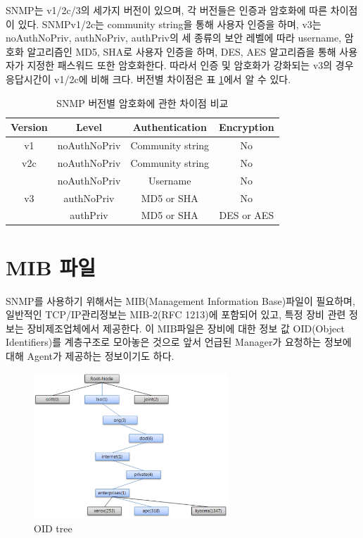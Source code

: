 \documentclass[11pt
  , a4paper
  , article
  , oneside
]{memoir}
\begin{document}
\hfil\break
\hfil\break
\hfil\break
\hfil\break

SNMP는 v1/2c/3의 세가지 버전이 있으며, 각 버전들은 인증과 암호화에 따른 차이점이 있다. SNMPv1/2c는 community string을 통해 사용자 인증을 하며, v3는 noAuthNoPriv, authNoPriv, authPriv의 세 종류의 보안 레벨에 따라 username, 암호화 알고리즘인 MD5, SHA로 사용자 인증을 하며, DES, AES 알고리즘을 통해 사용자가 지정한 패스워드 또한 암호화한다. 따라서 인증 및 암호화가 강화되는 v3의 경우 응답시간이 v1/2c에 비해 크다. 버전별 차이점은 표 \ref{table:conparision}\citep{comparison}에서 알 수 있다.

\begin{table}[h!]
\begin{center}
\begin{tabular}{c|c|c|c}\hline
Version & Level & Authentication & Encryption \\ \hline
v1 & noAuthNoPriv & Community string & No \\ \hline
v2c & noAuthNoPriv & Community string & No \\ \hline
 & noAuthNoPriv & Username & No \\ \cline{2-4}
v3 & authNoPriv & MD5 or SHA & No \\ \cline{2-4}
 & authPriv & MD5 or SHA & DES or AES \\ \hline
\end{tabular}
\caption{SNMP 버전별 암호화에 관한 차이점 비교}
  \label{table:conparision}  
\end{center}
\end{table} 

\section{MIB 파일}
SNMP를 사용하기 위해서는 MIB(Management Information Base)파일이 필요하며, 일반적인 TCP/IP관리정보는 MIB-2(RFC 1213)에 포함되어 있고, 특정 장비 관련 정보는 장비제조업체에서 제공한다. 이 MIB파일은 장비에 대한 정보 값 OID(Object Identifiers)를 계층구조로 모아놓은 것으로 앞서 언급된 Manager가 요청하는 정보에 대해 Agent가 제공하는 정보이기도 하다. 

\begin{figure}[h!]
  \centering
  \includegraphics[width=0.65\textwidth]{./images/oid_tree.eps}
  \caption{OID tree}
  \label{fig:oid_tree} 
\end{figure}
\end{document}
